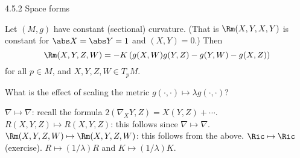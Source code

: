 4.5.2 Space forms

Let $(M,g)$ have constant (sectional) curvature.
(That is $\Rm(X,Y,X,Y)$ is constant for $\abs X=\abs Y=1$ and $(X,Y)=0$.)
Then
\[ \Rm(X,Y,Z,W) = -K\left( g(X,W)g(Y,Z)-g(Y,W)-g(X,Z) \right) \]
for all $p\in M$, and $X,Y,Z,W\in T_pM$.

What is the effect of scaling the metric $g(\cdot,\cdot) \mapsto \lambda g(\cdot,\cdot)$?
\begin{enum}
  \io $\nabla \mapsto \nabla$: recall the formula $2(\nabla_XY,Z)=X(Y,Z)+\cdots$.
  \io $R(X,Y,Z) \mapsto R(X,Y,Z)$: this follows since $\nabla \mapsto \nabla$.
  \io $\Rm(X,Y,Z,W) \mapsto \Rm(X,Y,Z,W)$: this follows from the above.
  \io $\Ric \mapsto \Ric$ (exercise).
  \io $R \mapsto (1/\lambda)R$ and $K \mapsto (1/\lambda)K$.
\end{enum}
